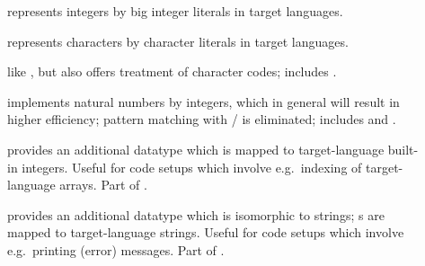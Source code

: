 \begin{isabellebody}
\begin{isamarkuptext}
  \begin{description}

    \item[] represents  integers by
       big integer literals in target languages.

    \item[] represents  characters by
       character literals in target languages.

    \item[] like , but
       also offers treatment of character codes; includes .

    \item[] \label{eff_nat} implements
       natural numbers by integers, which in general will result in
       higher efficiency; pattern matching with  /
        is eliminated; includes 
       and .

    \item[\hyperlink{theory.Code-Numeral}{\mbox{}}] provides an additional datatype
        which is mapped to target-language built-in
       integers.  Useful for code setups which involve e.g.~indexing
       of target-language arrays.  Part of .

    \item[\hyperlink{theory.String}{\mbox{}}] provides an additional datatype  which is isomorphic to strings; s are mapped to target-language strings.  Useful
       for code setups which involve e.g.~printing (error) messages.
       Part of .

  \end{description}


\end{isamarkuptext}
\end{isabellebody}
